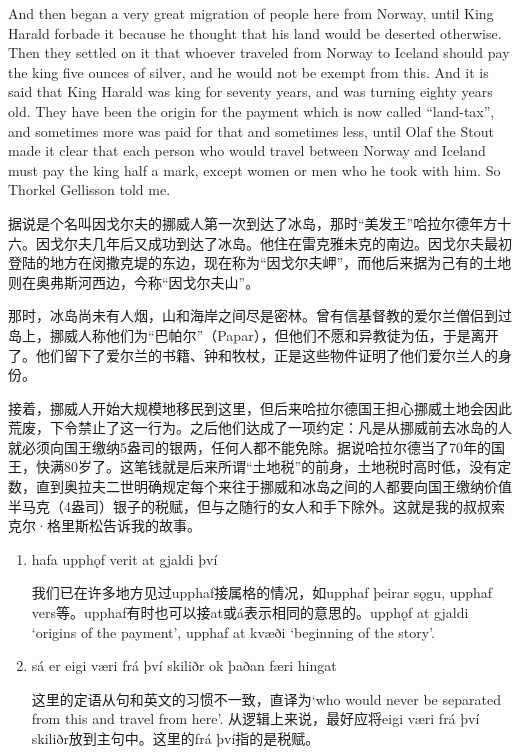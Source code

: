 \begin{paracol}{2}
    \switchcolumn

    And then began a very great migration of people here from Norway, until King Harald forbade it because he thought that his land would be deserted otherwise. Then they settled on it that whoever traveled from Norway to Iceland should pay the king five ounces of silver, and he would not be exempt from this. And it is said that King Harald was king for seventy years, and was turning eighty years old. They have been the origin for the payment which is now called ``land-tax'', and sometimes more was paid for that and sometimes less, until Olaf the Stout made it clear that each person who would travel between Norway and Iceland must pay the king half a mark, except women or men who he took with him. So Thorkel Gellisson told me.
\end{paracol}
\begin{translation*}{}
    据说是个名叫因戈尔夫的挪威人第一次到达了冰岛，那时“美发王”哈拉尔德年方十六。因戈尔夫几年后又成功到达了冰岛。他住在雷克雅未克的南边。因戈尔夫最初登陆的地方在闵撒克堤的东边，现在称为“因戈尔夫岬”，而他后来据为己有的土地则在奥弗斯河西边，今称“因戈尔夫山”。

    那时，冰岛尚未有人烟，山和海岸之间尽是密林。曾有信基督教的爱尔兰僧侣到过岛上，挪威人称他们为“巴帕尔”（Papar），但他们不愿和异教徒为伍，于是离开了。他们留下了爱尔兰的书籍、钟和牧杖，正是这些物件证明了他们爱尔兰人的身份。

    接着，挪威人开始大规模地移民到这里，但后来哈拉尔德国王担心挪威土地会因此荒废，下令禁止了这一行为。之后他们达成了一项约定：凡是从挪威前去冰岛的人就必须向国王缴纳5盎司的银两，任何人都不能免除。据说哈拉尔德当了70年的国王，快满80岁了。这笔钱就是后来所谓“土地税”的前身，土地税时高时低，没有定数，直到奥拉夫二世明确规定每个来往于挪威和冰岛之间的人都要向国王缴纳价值半马克（4盎司）银子的税赋，但与之随行的女人和手下除外。这就是我的叔叔索克尔·格里斯松告诉我的故事。
\end{translation*}
\begin{grammar*}{}
    \begin{enumerate}[leftmargin=*]
        \item hafa upphǫf verit at gjaldi því

              我们已在许多地方见过upphaf接属格的情况，如upphaf þeirar sǫgu, upphaf vers等。upphaf有时也可以接at或á表示相同的意思的。upphǫf at gjaldi `origins of the payment', upphaf at kvæði `beginning of the story'.
        \item sá er eigi væri frá því skiliðr ok þaðan færi hingat

              这里的定语从句和英文的习惯不一致，直译为`who would never be separated from this and travel from here'. 从逻辑上来说，最好应将eigi væri frá því skiliðr放到主句中。这里的frá því指的是税赋。
    \end{enumerate}
\end{grammar*}


